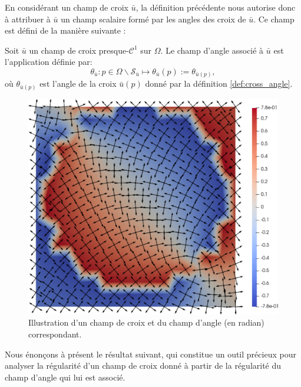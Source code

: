 
En considérant un champ de croix $\bar{u}$, la définition précédente nous autorise donc à attribuer à $\bar{u}$ un champ scalaire formé par les angles des croix de $\bar{u}$. Ce champ est défini de la manière suivante :

\begin{definition}
    Soit $\bar{u}$ un champ de croix presque-$\mathcal{C}^1$ sur $\Omega$. Le champ d'angle associé à $\bar{u}$ est l'application définie par:
    $$\theta_{\bar{u}}:p\in\Omega\backslash\mathcal{S}_{\bar{u}}\longmapsto\theta_{\bar{u}}(p):=\theta_{\bar{u}(p)},$$
    où $\theta_{\bar{u}(p)}$ est l'angle de la croix $\bar{u}(p)$ donné par la définition \ref{def:cross_angle}.
\end{definition}

\begin{figure}[!h]
  \centering
  \includegraphics[scale=0.35]{images/cross_ang_field.pdf}
  \caption{Illustration d'un champ de croix et du champ d'angle (en radian) correspondant.}
  \label{fig:cross_field}
\end{figure}


Nous énonçons à présent le résultat suivant, qui constitue un outil précieux pour analyser la régularité d'un champ de croix donné à partir de la régularité du champ d'angle qui lui est associé.


